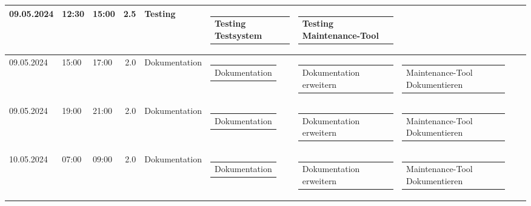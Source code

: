 {\begin{longtable}[H]{lllrllllll}
09.05.2024 & 12:30 & 15:00 & 2.5 & Testing & \begin{tabular}[c]{@{}l@{}}Testing Testsystem\end{tabular} & \begin{tabular}[c]{@{}l@{}}Testing Maintenance-Tool\end{tabular} & \begin{tabular}[c]{@{}l@{}}\end{tabular} & \begin{tabular}[c]{@{}l@{}}\end{tabular} & \begin{tabular}[c]{@{}l@{}}\end{tabular} \\ \midrule
09.05.2024 & 15:00 & 17:00 & 2.0 & Dokumentation & \begin{tabular}[c]{@{}l@{}}Dokumentation\end{tabular} & \begin{tabular}[c]{@{}l@{}}Dokumentation erweitern\end{tabular} & \begin{tabular}[c]{@{}l@{}}Maintenance-Tool Dokumentieren\end{tabular} & \begin{tabular}[c]{@{}l@{}}\end{tabular} & \begin{tabular}[c]{@{}l@{}}\end{tabular} \\ \midrule
09.05.2024 & 19:00 & 21:00 & 2.0 & Dokumentation & \begin{tabular}[c]{@{}l@{}}Dokumentation\end{tabular} & \begin{tabular}[c]{@{}l@{}}Dokumentation erweitern\end{tabular} & \begin{tabular}[c]{@{}l@{}}Maintenance-Tool Dokumentieren\end{tabular} & \begin{tabular}[c]{@{}l@{}}\end{tabular} & \begin{tabular}[c]{@{}l@{}}\end{tabular} \\ \midrule
10.05.2024 & 07:00 & 09:00 & 2.0 & Dokumentation & \begin{tabular}[c]{@{}l@{}}Dokumentation\end{tabular} & \begin{tabular}[c]{@{}l@{}}Dokumentation erweitern\end{tabular} & \begin{tabular}[c]{@{}l@{}}Maintenance-Tool Dokumentieren\end{tabular} & \begin{tabular}[c]{@{}l@{}}\end{tabular} & \begin{tabular}[c]{@{}l@{}}\end{tabular} \\ \midrule

\end{longtable}}
